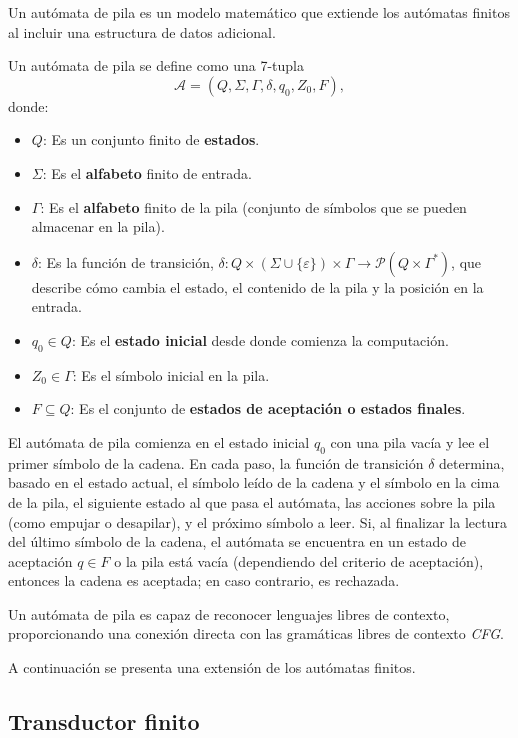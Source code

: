 Un autómata de pila \cite{authomataTheory} es un modelo matemático que extiende los autómatas finitos al incluir una estructura de datos adicional. 

Un autómata de pila se define como una 7-tupla
\[
      \mathcal{A} = (Q, \Sigma, \Gamma, \delta, q_0, Z_0, F),
\]
donde:

\begin{itemize}
      \item $Q$: Es un conjunto finito de \textbf{estados}.
      \item $\Sigma$: Es el \textbf{alfabeto} finito de entrada.
      \item $\Gamma$: Es el \textbf{alfabeto} finito de la pila (conjunto de símbolos que se pueden almacenar en la pila).
      \item $\delta$: Es la función de transición, $\delta: Q \times (\Sigma \cup \{\varepsilon\}) \times \Gamma \to \mathcal{P}(Q \times \Gamma^*)$, que describe cómo cambia el estado, el contenido de la pila y la posición en la entrada.
      \item $q_0 \in Q$: Es el \textbf{estado inicial} desde donde comienza la computación.
      \item $Z_0 \in \Gamma$: Es el símbolo inicial en la pila.
      \item $F \subseteq Q$: Es el conjunto de \textbf{estados de aceptación o estados finales}.
\end{itemize}

El autómata de pila comienza en el estado inicial $q_0$ con una pila vacía y lee el primer símbolo de la cadena.
En cada paso, la función de transición $\delta$ determina, basado en el estado actual, el símbolo leído de la cadena y el símbolo en la cima de la pila, el siguiente estado al que pasa el autómata, las acciones sobre la pila (como empujar o desapilar), y el próximo símbolo a leer.
Si, al finalizar la lectura del último símbolo de la cadena, el autómata se encuentra en un estado de aceptación $q \in F$ o la pila está vacía (dependiendo del criterio de aceptación), entonces la cadena es aceptada; en caso contrario, es rechazada.

Un autómata de pila es capaz de reconocer lenguajes libres de contexto, proporcionando una conexión directa con las gramáticas libres de contexto \textit{CFG}.

A continuación se presenta una extensión de los autómatas finitos.

\subsection{Transductor finito}

